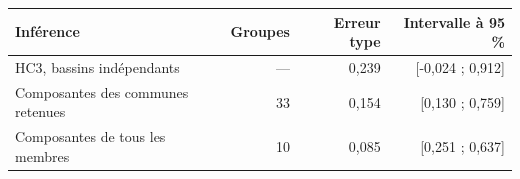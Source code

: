 \begin{tabularx}{\linewidth}{Xrrr}
\toprule
Inférence & Groupes & Erreur type & Intervalle à 95 \% \\
\midrule
HC3, bassins indépendants & — & 0,239 & [-0,024 ; 0,912] \\
Composantes des communes retenues & 33 & 0,154 & [0,130 ; 0,759] \\
Composantes de tous les membres & 10 & 0,085 & [0,251 ; 0,637] \\
\bottomrule
\end{tabularx}

